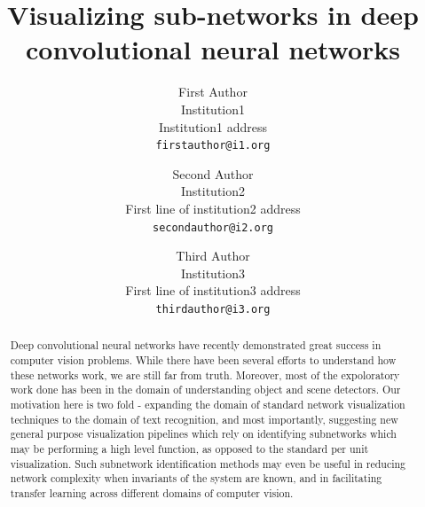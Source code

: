 \documentclass[10pt,twocolumn,letterpaper]{article}
\begin{document}
\title{Visualizing sub-networks in deep convolutional neural networks}


\author{First Author\\
Institution1\\
Institution1 address\\
{\tt\small firstauthor@i1.org}
\and
Second Author\\
Institution2\\
First line of institution2 address\\
{\tt\small secondauthor@i2.org}
\and
Third Author\\
Institution3\\
First line of institution3 address\\
{\tt\small thirdauthor@i3.org}
}


\maketitle


\begin{abstract}
  Deep convolutional neural networks have recently demonstrated great success in computer vision problems. While there have been several efforts to understand how these networks work, we are still far from truth. Moreover, most of the expoloratory work done has been in the domain of understanding object and scene detectors. Our motivation here is two fold - expanding the domain of standard network visualization techniques to the domain of text recognition, and most importantly, suggesting new general purpose visualization pipelines which rely on identifying subnetworks which may be performing a high level function, as opposed to the standard per unit visualization. Such subnetwork identification methods may even be useful in reducing network complexity when invariants of the system are known, and in facilitating transfer learning across different domains of computer vision.
\end{abstract}


\end{document}
